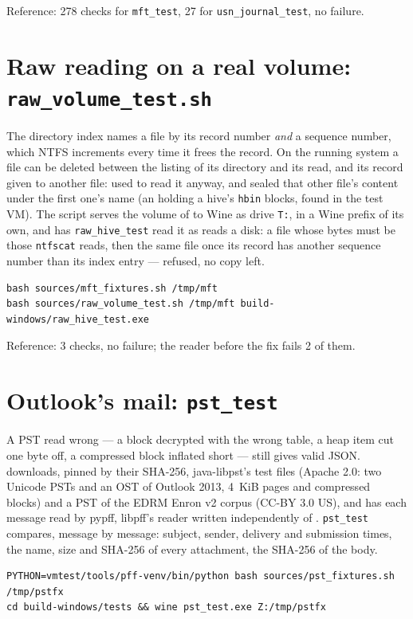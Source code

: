 \documentclass[11pt,a4paper,oneside]{report}
\begin{document}
Reference: 278 checks for \texttt{mft\_test}, 27 for
\texttt{usn\_journal\_test}, no failure.

\section{Raw reading on a real volume: \texttt{raw\_volume\_test.sh}}

The directory index names a file by its record number \emph{and} a sequence
number, which NTFS increments every time it frees the record. On the running
system a file can be deleted between the listing of its directory and its
read, and its record given to another file: \wac{} used to read it anyway,
and sealed that other file's content under the first one's name (an
 holding a hive's \texttt{hbin} blocks, found in the test
VM). The script serves the volume of  to Wine as
drive \texttt{T:}, in a Wine prefix of its own, and has
\texttt{raw\_hive\_test} read it as \wac{} reads a disk: a file whose bytes
must be those \texttt{ntfscat} reads, then the same file once its record has
another sequence number than its index entry — refused, no copy left.

\begin{lstlisting}
bash sources/mft_fixtures.sh /tmp/mft
bash sources/raw_volume_test.sh /tmp/mft build-windows/raw_hive_test.exe
\end{lstlisting}

Reference: 3 checks, no failure; the reader before the fix fails 2 of them.

\section{Outlook's mail: \texttt{pst\_test}}

A PST read wrong — a block decrypted with the wrong table, a heap item cut one
byte off, a compressed block inflated short — still gives valid JSON.
 downloads, pinned by their SHA-256, java-libpst's
test files (Apache 2.0: two Unicode PSTs and an OST of Outlook 2013, 4~KiB
pages and compressed blocks) and a PST of the EDRM Enron v2 corpus (CC-BY 3.0
US), and has each message read by pypff, libpff's reader written independently
of \wac{}. \texttt{pst\_test} compares, message by message: subject, sender,
delivery and submission times, the name, size and SHA-256 of every
attachment, the SHA-256 of the body.

\begin{lstlisting}
PYTHON=vmtest/tools/pff-venv/bin/python bash sources/pst_fixtures.sh /tmp/pstfx
cd build-windows/tests && wine pst_test.exe Z:/tmp/pstfx
\end{lstlisting}
\end{document}
